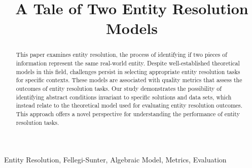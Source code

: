 \documentclass[journal]{IEEEtran}
\begin{document}
    \title{A Tale of Two Entity Resolution Models}
    \author{
    }

    \maketitle

    \theoremstyle{definition}
    \newtheorem{defn}{Definition}[section]
    
    \maketitle
    \begin{abstract}
        This paper examines entity resolution, the process of identifying if two
        pieces of information represent the same real-world entity.
        Despite well-established theoretical models in this field, challenges
        persist in selecting appropriate entity resolution tasks for specific
        contexts.
        These models are associated with quality metrics that assess the
        outcomes of entity resolution tasks.
        Our study demonstrates the possibility of identifying abstract
        conditions invariant to specific solutions and data sets, which instead
        relate to the theoretical model used for evaluating entity resolution
        outcomes.
        This approach offers a novel perspective for understanding the
        performance of entity resolution tasks.
    \end{abstract}

    \begin{IEEEkeywords}
        Entity Resolution, Fellegi-Sunter, Algebraic Model, Metrics, Evaluation
    \end{IEEEkeywords}
\end{document}
